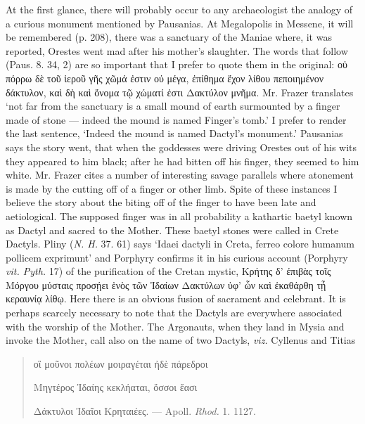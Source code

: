 \documentclass[a4paper, 11pt, oneside, polutonikogreek, english]{article}
\begin{document}
At the first glance, there will probably occur to any archaeologist the analogy of a curious monument mentioned by Pausanias. At Megalopolis in Messene, it will be remembered (p. 208), there was a sanctuary of the Maniae where, it was reported, Orestes went mad after his mother's slaughter. The words that follow (Paus. 8. 34, 2) are so important that I prefer to quote them in the original: οὐ πόρρω δὲ τοῦ ἱεροῦ γῆς χῶμά ἐστιν οὐ μέγα, ἐπίθημα ἔχον λίθου πεποιημένον δάκτυλον, καὶ δὴ καὶ ὄνομα τῷ χώματί ἐστι Δακτύλον μνῆμα. Mr. Frazer translates `not far from the sanctuary is a small mound of earth surmounted by a finger made of stone --- indeed the mound is named Finger's tomb.' I prefer to render the last sentence, `Indeed the mound is named Dactyl's monument.' Pausanias says the story went, that when the goddesses were driving Orestes out of his wits they appeared to him black; after he had bitten off his finger, they seemed to him white. Mr. Frazer cites a number of interesting savage parallels where atonement is made by the cutting off of a finger or other limb. Spite of these instances I believe the story about the biting off of the finger to have been late and aetiological. The supposed finger was in all probability a kathartic baetyl known as Dactyl and sacred to the Mother. These baetyl stones were called in Crete Dactyls. Pliny (\emph{N. H.} 37. 61) says `Idaei dactyli in Creta, ferreo colore humanum pollicem exprimunt' and Porphyry confirms it in his curious account (Porphyry \emph{vit. Pyth.} 17) of the purification of the Cretan mystic, Κρήτης δ' ἐπιβὰς τοῖς Μόργου μύσταις προσῄει ἑνὸς τῶν Ἰδαίων Δακτύλων ὑφ' ὧν καὶ ἐκαθάρθη τᾖ κεραυνίᾳ λίθῳ. Here there is an obvious fusion of sacrament and celebrant. It is perhaps scarcely necessary to note that the Dactyls are everywhere associated with the worship of the Mother. The Argonauts, when they land in Mysia and invoke the Mother, call also on the name of two Dactyls, \emph{viz.} Cyllenus and Titias
\begin{quotation}
\large
οἳ μοῦνοι πολέων μοιραγέται ἠδὲ πάρεδροι

Μηγτέρος Ἰδαίης κεκλήαται, ὅσσοι ἔασι

Δάκτυλοι Ἰδαῖοι Κρηταιέες. --- Apoll. \emph{Rhod.} 1. 1127.
\end{quotation}
\end{document}

